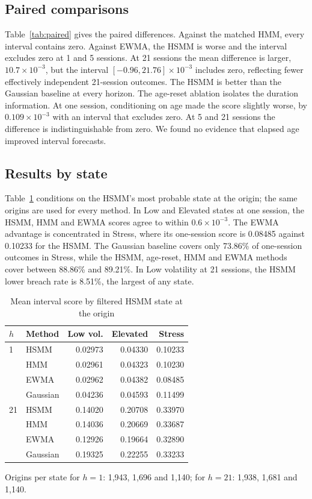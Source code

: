 \documentclass[conference]{IEEEtran}
\begin{document}
\subsection{Paired comparisons}
Table~\ref{tab:paired} gives the paired differences. Against the matched HMM, every interval contains zero. Against EWMA, the HSMM is worse and the interval excludes zero at 1 and 5 sessions. At 21 sessions the mean difference is larger, $10.7\times10^{-3}$, but the interval $[-0.96, 21.76]\times10^{-3}$ includes zero, reflecting fewer effectively independent 21-session outcomes. The HSMM is better than the Gaussian baseline at every horizon. The age-reset ablation isolates the duration information. At one session, conditioning on age made the score slightly worse, by $0.109\times10^{-3}$ with an interval that excludes zero. At 5 and 21 sessions the difference is indistinguishable from zero. We found no evidence that elapsed age improved interval forecasts.

\subsection{Results by state}
Table~\ref{tab:state} conditions on the HSMM's most probable state at the origin; the same origins are used for every method. In Low and Elevated states at one session, the HSMM, HMM and EWMA scores agree to within $0.6\times10^{-3}$. The EWMA advantage is concentrated in Stress, where its one-session score is 0.08485 against 0.10233 for the HSMM. The Gaussian baseline covers only 73.86\% of one-session outcomes in Stress, while the HSMM, age-reset, HMM and EWMA methods cover between 88.86\% and 89.21\%. In Low volatility at 21 sessions, the HSMM lower breach rate is 8.51\%, the largest of any state.

\begin{table}[t]
\centering
\caption{Mean interval score by filtered HSMM state at the origin}
\label{tab:state}
\footnotesize
\setlength{\tabcolsep}{4.5pt}
\begin{tabular}{@{}llrrr@{}}
\toprule
$h$ & Method & Low vol. & Elevated & Stress \\
\midrule
1 & HSMM & 0.02973 & 0.04330 & 0.10233 \\
  & HMM & 0.02961 & 0.04323 & 0.10230 \\
  & EWMA & 0.02962 & 0.04382 & 0.08485 \\
  & Gaussian & 0.04236 & 0.04593 & 0.11499 \\
\midrule
21 & HSMM & 0.14020 & 0.20708 & 0.33970 \\
  & HMM & 0.14036 & 0.20669 & 0.33687 \\
  & EWMA & 0.12926 & 0.19664 & 0.32890 \\
  & Gaussian & 0.19325 & 0.22255 & 0.33233 \\
\bottomrule
\end{tabular}

\vspace{2pt}
\parbox{\columnwidth}{\scriptsize Origins per state for $h=1$: 1,943, 1,696 and 1,140; for $h=21$: 1,938, 1,681 and 1,140.}
\end{table}
\end{document}

